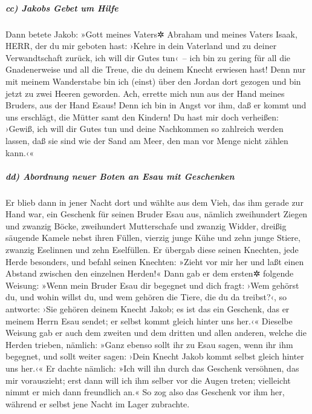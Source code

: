 \hypertarget{cc-jakobs-gebet-um-hilfe}{%
\subparagraph{cc) Jakobs Gebet um
Hilfe}\label{cc-jakobs-gebet-um-hilfe}}

 Dann betete Jakob: »Gott meines Vaters✲ Abraham und
meines Vaters Isaak, HERR, der du mir geboten hast: ›Kehre in dein
Vaterland und zu deiner Verwandtschaft zurück, ich will dir Gutes
tun‹~--  ich bin zu gering für all die Gnadenerweise und
all die Treue, die du deinem Knecht erwiesen hast! Denn nur mit meinem
Wanderstabe bin ich (einst) über den Jordan dort gezogen und bin jetzt
zu zwei Heeren geworden.  Ach, errette mich nun aus der
Hand meines Bruders, aus der Hand Esaus! Denn ich bin in Angst vor ihm,
daß er kommt und uns erschlägt, die Mütter samt den Kindern!
 Du hast mir doch verheißen: ›Gewiß, ich will dir Gutes
tun und deine Nachkommen so zahlreich werden lassen, daß sie sind wie
der Sand am Meer, den man vor Menge nicht zählen kann.‹«

\hypertarget{dd-abordnung-neuer-boten-an-esau-mit-geschenken}{%
\subparagraph{dd) Abordnung neuer Boten an Esau mit
Geschenken}\label{dd-abordnung-neuer-boten-an-esau-mit-geschenken}}

 Er blieb dann in jener Nacht dort und wählte aus dem
Vieh, das ihm gerade zur Hand war, ein Geschenk für seinen Bruder Esau
aus,  nämlich zweihundert Ziegen und zwanzig Böcke,
zweihundert Mutterschafe und zwanzig Widder,  dreißig
säugende Kamele nebst ihren Füllen, vierzig junge Kühe und zehn junge
Stiere, zwanzig Eselinnen und zehn Eselfüllen.  Er
übergab diese seinen Knechten, jede Herde besonders, und befahl seinen
Knechten: »Zieht vor mir her und laßt einen Abstand zwischen den
einzelnen Herden!«  Dann gab er dem ersten✲ folgende
Weisung: »Wenn mein Bruder Esau dir begegnet und dich fragt: ›Wem
gehörst du, und wohin willst du, und wem gehören die Tiere, die du da
treibst?‹,  so antworte: ›Sie gehören deinem Knecht
Jakob; es ist das ein Geschenk, das er meinem Herrn Esau sendet; er
selbst kommt gleich hinter uns her.‹«  Dieselbe Weisung
gab er auch dem zweiten und dem dritten und allen anderen, welche die
Herden trieben, nämlich: »Ganz ebenso sollt ihr zu Esau sagen, wenn ihr
ihm begegnet,  und sollt weiter sagen: ›Dein Knecht Jakob
kommt selbst gleich hinter uns her.‹« Er dachte nämlich: »Ich will ihn
durch das Geschenk versöhnen, das mir vorauszieht; erst dann will ich
ihm selber vor die Augen treten; vielleicht nimmt er mich dann
freundlich an.«  So zog also das Geschenk vor ihm her,
während er selbst jene Nacht im Lager zubrachte.


